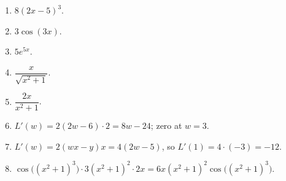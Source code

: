 \begin{enumerate}[label=\textbf{\ansnum.\arabic*}]
  \item $8(2x-5)^3$.
  \item $3\cos(3x)$.
  \item $5e^{5x}$.
  \item $\dfrac{x}{\sqrt{x^2+1}}$.
  \item $\dfrac{2x}{x^2+1}$.
  \item $L'(w)=2(2w-6)\cdot2=8w-24$; zero at $w=3$.
  \item $L'(w)=2(wx-y)x=4(2w-5)$, so $L'(1)=4\cdot(-3)=-12$.
  \item[\textbf{\ansnum.8}] $\cos\bigl((x^2+1)^3\bigr)\cdot 3(x^2+1)^2\cdot 2x=6x(x^2+1)^2\cos\bigl((x^2+1)^3\bigr)$.
\end{enumerate}
